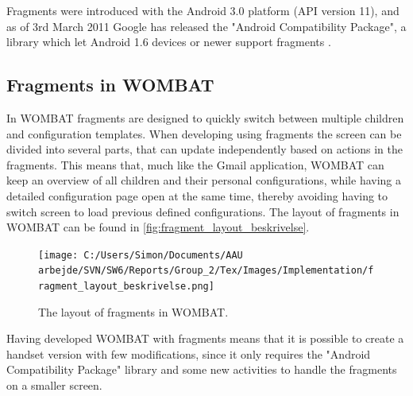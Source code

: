 Fragments were introduced with the Android 3.0 platform (API version 11), and as of 3rd March 2011 Google has released the "Android Compatibility Package", a library which let Android 1.6 devices or newer support fragments \cite{web:android:fragments:support}.
 
\subsection{Fragments in WOMBAT}
In WOMBAT fragments are designed to quickly switch between multiple children and configuration templates. When developing using fragments the screen can be divided into several parts, that can update independently based on actions in the fragments.
This means that, much like the Gmail application, WOMBAT can keep an overview of all children and their personal configurations, while having a detailed configuration page open at the same time, thereby avoiding having to switch screen to load previous defined configurations. The layout of fragments in WOMBAT can be found in \autoref{fig:fragment_layout_beskrivelse}.\\

\begin{figure}[H]
	\centering
		\texttt{[image: C:/Users/Simon/Documents/AAU arbejde/SVN/SW6/Reports/Group\_2/Tex/Images/Implementation/fragment\_layout\_beskrivelse.png]}
	\caption{The layout of fragments in WOMBAT.}
	\label{fig:fragment_layout_beskrivelse}
\end{figure}

Having developed WOMBAT with fragments means that it is possible to create a handset version with few modifications, since it only requires the "Android Compatibility Package" library and some new activities to handle the fragments on a smaller screen.